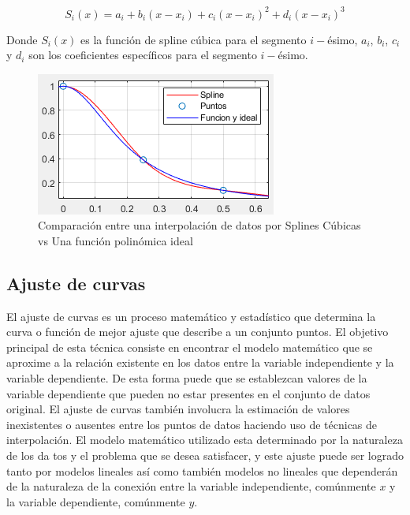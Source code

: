 \begin{equation}
    S_{i}(x)=a_{i} + b_{i}(x-x_{i}) + c_{i}(x-x_{i})^{2} + d_{i}(x-x_{i})^{3}
\end{equation}

Donde $S_{i}(x)$ es la función de spline cúbica para el segmento $i-$ésimo, $a_{i}$, $b_{i}$, $c_{i}$ y $d_{i}$ son los coeficientes específicos para el segmento $i-$ésimo. 

\begin{figure}[h]
    \centering
    \includegraphics[scale=1.18]{img/splines.png}
    \caption{Comparación entre una interpolación de datos por Splines Cúbicas vs Una función polinómica ideal}
    \label{splinesfig}
\end{figure}


\pagebreak

\subsection{Ajuste de curvas}

El ajuste de curvas es un proceso matemático y estadístico que determina la curva o función de mejor ajuste que describe a un conjunto puntos. El objetivo principal de esta técnica consiste en encontrar el modelo matemático que se aproxime a la relación existente en los datos entre la variable independiente y la variable dependiente. De esta forma puede que se establezcan valores de la variable dependiente que pueden no estar presentes en el conjunto de datos original. El ajuste de curvas también involucra la estimación de valores inexistentes o ausentes entre los puntos de datos haciendo uso de técnicas de interpolación. El modelo matemático utilizado esta determinado por la naturaleza de los da tos y el problema que se desea satisfacer, y este ajuste puede ser logrado tanto por modelos lineales así como también modelos no lineales que dependerán de la naturaleza de la conexión entre la variable independiente, comúnmente $x$ y la variable dependiente, comúnmente $y$.

